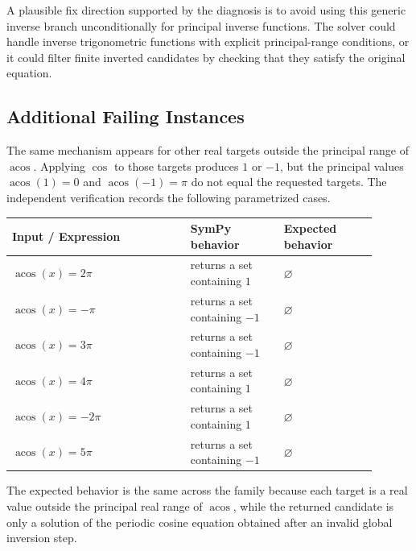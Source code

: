 \documentclass[11pt]{article}
\begin{document}
A plausible fix direction supported by the diagnosis is to avoid using this
generic inverse branch unconditionally for principal inverse functions.  The
solver could handle inverse trigonometric functions with explicit
principal-range conditions, or it could filter finite inverted candidates by
checking that they satisfy the original equation.

\subsection{Additional Failing Instances}

The same mechanism appears for other real targets outside the principal range
of \(\operatorname{acos}\).  Applying \(\cos\) to those targets produces \(1\) or \(-1\), but
the principal values \(\operatorname{acos}(1) = 0\) and \(\operatorname{acos}(-1) = \pi\) do not equal the
requested targets.  The independent verification records the following
parametrized cases.

\begin{center}
\small
\renewcommand{\arraystretch}{1.3}
\begin{tabular}{@{}>{\raggedright\arraybackslash}p{0.44\linewidth}>{\raggedright\arraybackslash}p{0.23\linewidth}>{\raggedright\arraybackslash}p{0.23\linewidth}@{}}
\toprule
\textbf{Input / Expression} & \textbf{SymPy behavior} & \textbf{Expected behavior} \\
\midrule
\(\operatorname{acos}(x) = 2\pi\) & returns a set containing \(1\) & \(\varnothing\) \\
\(\operatorname{acos}(x) = -\pi\) & returns a set containing \(-1\) & \(\varnothing\) \\
\(\operatorname{acos}(x) = 3\pi\) & returns a set containing \(-1\) & \(\varnothing\) \\
\(\operatorname{acos}(x) = 4\pi\) & returns a set containing \(1\) & \(\varnothing\) \\
\(\operatorname{acos}(x) = -2\pi\) & returns a set containing \(1\) & \(\varnothing\) \\
\(\operatorname{acos}(x) = 5\pi\) & returns a set containing \(-1\) & \(\varnothing\) \\
\bottomrule
\end{tabular}
\end{center}

The expected behavior is the same across the family because each target is a
real value outside the principal real range of \(\operatorname{acos}\), while the returned
candidate is only a solution of the periodic cosine equation obtained after an
invalid global inversion step.
\end{document}

